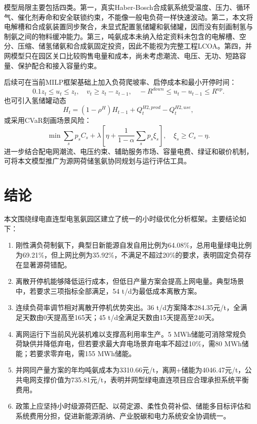 \documentclass[UTF8,a4paper,12pt]{ctexart}
\begin{document}
模型局限主要包括四类。第一，真实Haber-Bosch合成氨系统受温度、压力、循环气、催化剂寿命和安全联锁约束，不能像一般电负荷一样快速波动。第二，本文将电解槽和合成氨装置同步聚合，未显式配置氢储罐和氨储罐，因而没有刻画制氢与制氨之间的物料缓冲能力。第三，吨氨成本未纳入给定资料未包含的电解槽、空分、压缩、储氢储氨和合成氨固定投资，因此不能视为完整工程LCOA。第四，并网模型只在园区关口比较购售电量和成本，尚未考虑潮流、电压、无功、短路容量、保护配合和接入容量约束。

后续可在当前MILP框架基础上加入负荷爬坡率、启停成本和最小开停时间：
\[
0.1z_t\le u_t\le z_t,\quad
v_t\ge z_t-z_{t-1},\quad
-R^{down}\le u_t-u_{t-1}\le R^{up}.
\]
也可引入氢储罐动态
\[
H_t=(1-\rho^H)H_{t-1}+Q^{H2,prod}_t-Q^{H2,use}_t,
\]
或采用CVaR刻画场景风险：
\[
\min \sum_sp_sC_s+\lambda\left[\eta+\frac{1}{1-\alpha}\sum_sp_s\xi_s\right],
\quad \xi_s\ge C_s-\eta.
\]
进一步结合配电网潮流、电压约束、辅助服务市场、容量电费、绿证和碳价机制，可将本文模型推广为源网荷储氢氨协同规划与运行评估工具。

\section{结论}

本文围绕绿电直连型电氢氨园区建立了统一的小时级优化分析框架。主要结论如下：

\begin{enumerate}[label=(\arabic*)]
  \item 刚性满负荷制氨下，典型日新能源自发自用比例为64.08\%，总用电量绿电比例为69.21\%，但上网比例为35.92\%，不满足不超过20\%的要求，表明固定负荷存在显著源荷错配。
  \item 离散开停机能够降低运行成本，但低日产量方案会提高上网电量。典型场景中，若要求三项指标全部满足，54 t/d为最低成本离散方案。
  \item 连续负荷率调节相对离散开停机优势突出。36 t/d方案降本284.35元/t，全满足天数由0天提高至165天；45 t/d全满足天数由15天提高至240天。
  \item 离网运行下当前风光装机难以支撑高利用率生产。5 MWh储能可消除常规负荷缺供并降低弃电，但若要求最大弃电场景弃电率不超过10\%，需80 MWh储能；若要求零弃电，需155 MWh储能。
  \item 并网同产量方案的年均吨氨成本为3310.66元/t，离网+储能为4046.47元/t，公共电网支撑价值为735.81元/t，表明并网型绿电直连项目应合理承担系统平衡费用。
  \item 政策上应坚持小时级源荷匹配、以荷定源、柔性负荷补偿、储能多目标评估和系统费用分担，促进新能源消纳、产业脱碳和电力系统安全协调统一。
\end{enumerate}
\end{document}

